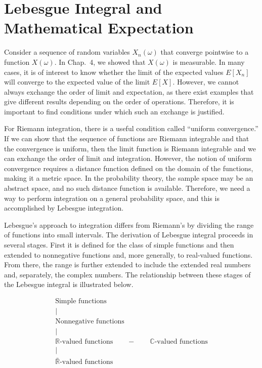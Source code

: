 
\section*{Lebesgue Integral and Mathematical Expectation}

Consider a sequence of random variables $X_n(\omega)$ that converge pointwise to a function $X(\omega)$. In Chap.~4, we showed that $X(\omega)$ is measurable. In many cases, it is of interest to know whether the limit of the expected values $E[X_n]$ will converge to the expected value of the limit $E[X]$. However, we cannot always exchange the order of limit and expectation, as there exist examples that give different results depending on the order of operations. Therefore, it is important to find conditions under which such an exchange is justified.

For Riemann integration, there is a useful condition called ``uniform convergence.'' If we can show that the sequence of functions are Riemann integrable and that the convergence is uniform, then the limit function is Riemann integrable and we can exchange the order of limit and integration. However, the notion of uniform convergence requires a distance function defined on the domain of the functions, making it a metric space. In the probability theory, the sample space may be an abstract space, and no such distance function is available. Therefore, we need a way to perform integration on a general probability space, and this is accomplished by Lebesgue integration.

Lebesgue's approach to integration differs from Riemann's by dividing the range of functions into small intervals. The derivation of Lebesgue integral proceeds in several stages. First it is defined for the class of simple functions and then extended to nonnegative functions and, more generally, to real-valued functions. From there, the range is further extended to include the extended real numbers and, separately, the complex numbers. The relationship between these stages of the Lebesgue integral is illustrated below.

\[
\begin{array}{c}
\text{Simple functions} \\
\vert \\
\text{Nonnegative functions} \\
\vert \\
\mathbb{R}\text{-valued functions} \qquad - \qquad \mathbb{C}\text{-valued functions} \\
\vert \\
\bar{\mathbb{R}}\text{-valued functions}
\end{array}
\]

